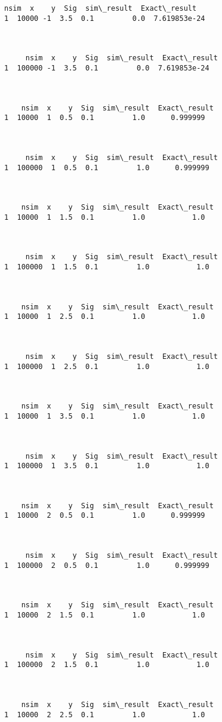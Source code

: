 \documentclass[12pt]{article}
\begin{document}
\begin{Verbatim}[commandchars=\\\{\}]
    nsim  x    y  Sig  sim\_result  Exact\_result
1  10000 -1  3.5  0.1         0.0  7.619853e-24



     nsim  x    y  Sig  sim\_result  Exact\_result
1  100000 -1  3.5  0.1         0.0  7.619853e-24



    nsim  x    y  Sig  sim\_result  Exact\_result
1  10000  1  0.5  0.1         1.0      0.999999



     nsim  x    y  Sig  sim\_result  Exact\_result
1  100000  1  0.5  0.1         1.0      0.999999



    nsim  x    y  Sig  sim\_result  Exact\_result
1  10000  1  1.5  0.1         1.0           1.0



     nsim  x    y  Sig  sim\_result  Exact\_result
1  100000  1  1.5  0.1         1.0           1.0



    nsim  x    y  Sig  sim\_result  Exact\_result
1  10000  1  2.5  0.1         1.0           1.0



     nsim  x    y  Sig  sim\_result  Exact\_result
1  100000  1  2.5  0.1         1.0           1.0



    nsim  x    y  Sig  sim\_result  Exact\_result
1  10000  1  3.5  0.1         1.0           1.0



     nsim  x    y  Sig  sim\_result  Exact\_result
1  100000  1  3.5  0.1         1.0           1.0



    nsim  x    y  Sig  sim\_result  Exact\_result
1  10000  2  0.5  0.1         1.0      0.999999



     nsim  x    y  Sig  sim\_result  Exact\_result
1  100000  2  0.5  0.1         1.0      0.999999



    nsim  x    y  Sig  sim\_result  Exact\_result
1  10000  2  1.5  0.1         1.0           1.0



     nsim  x    y  Sig  sim\_result  Exact\_result
1  100000  2  1.5  0.1         1.0           1.0



    nsim  x    y  Sig  sim\_result  Exact\_result
1  10000  2  2.5  0.1         1.0           1.0




\end{Verbatim}
\end{document}
